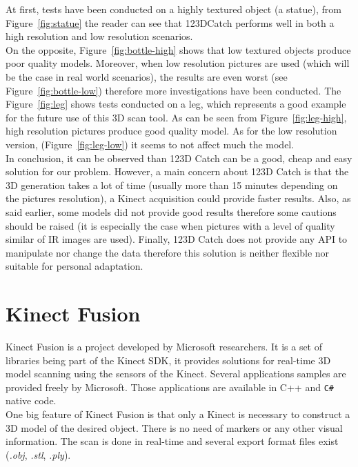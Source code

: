 At first, tests have been conducted on a highly textured object (a statue), from Figure~\ref{fig:statue} the reader can see that 123DCatch performs well in both a high resolution and low resolution scenarios. \\

On the opposite, Figure~\ref{fig:bottle-high} shows that low textured objects produce poor quality models. Moreover, when low resolution pictures are used (which will be the case in real world scenarios), the results are even worst (see Figure~\ref{fig:bottle-low}) therefore more investigations have been conducted. The Figure~\ref{fig:leg} shows tests conducted on a leg, which represents a good example for the future use of this 3D scan tool. As can be seen from Figure~\ref{fig:leg-high}, high resolution pictures produce good quality model. As for the low resolution version, (Figure~\ref{fig:leg-low}) it seems to not affect much the model.\\

In conclusion, it can be observed than 123D Catch can be a good, cheap and easy solution for our problem. However, a main concern about 123D Catch is that the 3D generation takes a lot of time (usually more than 15 minutes 
depending on the pictures resolution), a Kinect acquisition could provide faster results. Also, as said earlier, some
models did not provide good results therefore some cautions should be raised (it is especially the case when pictures with a level of quality similar of IR images are used). Finally, 123D Catch does not provide any 
API to manipulate nor change the data therefore this solution is neither flexible nor suitable for personal adaptation.

\section{Kinect Fusion}
Kinect Fusion is a project developed by Microsoft researchers. It is a set of libraries being part of the Kinect SDK, it provides solutions for real-time 3D model scanning using the sensors of the Kinect. Several applications samples are provided freely by Microsoft. Those applications are available in C++ and \texttt{C\#} native code.\\ 

One big feature of Kinect Fusion is that only a Kinect is necessary to construct a 3D model of the desired object. There is no need of markers or any other visual information. The scan is done in real-time and several export format files exist (\textit{.obj}, \textit{.stl}, \textit{.ply}). \\

